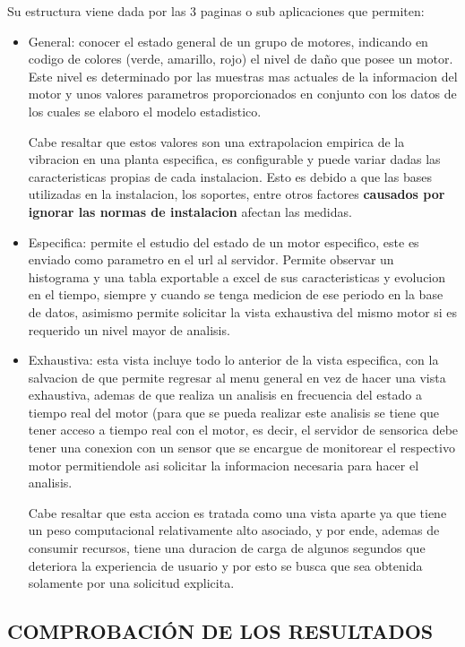 Su estructura viene dada por las 3 paginas o sub aplicaciones que permiten:

\begin{itemize}
    \item General: conocer el estado general de un grupo de motores, indicando
        en codigo de colores (verde, amarillo, rojo) el nivel de daño que posee
        un motor. Este nivel es determinado por las muestras mas actuales de
        la informacion del motor y unos valores parametros proporcionados en
        conjunto con los datos de los cuales se elaboro el modelo estadistico.

        Cabe resaltar que estos valores son una extrapolacion empirica de la
        vibracion en una planta especifica, es configurable y puede variar dadas
        las caracteristicas propias de cada instalacion. Esto es debido a que
        las bases utilizadas en la instalacion, los soportes, entre otros factores
        \textbf{causados por ignorar las normas de instalacion} afectan las medidas.

    \item Especifica:  permite el estudio del estado de un motor especifico,
        este es enviado como parametro en el url al servidor. Permite observar
        un histograma y una tabla exportable a excel de sus caracteristicas y
        evolucion en el tiempo, siempre y cuando se tenga medicion de ese periodo
        en la base de datos, asimismo permite solicitar la vista exhaustiva del
        mismo motor si es requerido un nivel mayor de analisis.

    \item Exhaustiva: esta vista incluye todo lo anterior de la vista especifica,
        con la salvacion de que permite regresar al menu general en vez de hacer
        una vista exhaustiva, ademas de que realiza un analisis en frecuencia
        del estado a tiempo real del motor (para que se pueda realizar este
        analisis se tiene que tener acceso a tiempo real con el motor, es decir,
        el servidor de sensorica debe tener una conexion con un sensor que se
        encargue de monitorear el respectivo motor permitiendole asi solicitar
        la informacion necesaria para hacer el analisis.

        Cabe resaltar que esta accion es tratada como una vista aparte ya que
        tiene un peso computacional relativamente alto asociado, y por ende,
        ademas de consumir recursos, tiene una duracion de carga de algunos
        segundos que deteriora la experiencia de usuario y por esto se busca que
        sea obtenida solamente por una solicitud explicita.
\end{itemize}




\subsection{COMPROBACIÓN DE LOS RESULTADOS}
